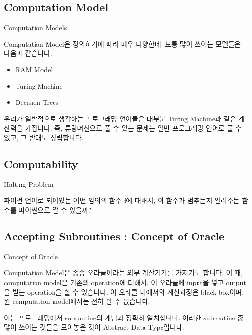 \documentclass{beamer}
\begin{document}
\subsection{Computation Model} 

\begin{frame}{Computation Models} 

Computation Model은 정의하기에 따라 매우 다양한데, 보통 많이 쓰이는 모델들은 다음과 같습니다. 

\begin{itemize} 
\item RAM Model 
\item Turing Machine 
\item Decision Trees
\end{itemize}

우리가 일반적으로 생각하는 프로그래밍 언어들은 대부분 Turing Machine과 같은 계산력을 가집니다. 즉, 튜링머신으로 풀 수 있는 문제는 일반 프로그래밍 언어로 풀 수 있고, 그 반대도 성립합니다. 
\end{frame} 


\subsection{Computability} 


\begin{frame}{Halting Problem}

파이썬 언어로 되어있는 어떤 임의의 함수 f에 대해서, 이 함수가 멈추는지 알려주는 함수를 파이썬으로 짤 수 있을까?

\end{frame}

\subsection{Accepting Subroutines : Concept of Oracle}

\begin{frame}{Concept of Oracle} 

Computation Model은 종종 오라클이라는 외부 계산기기를 가지기도 합니다. 이 때, computation model은 기존의 operation에 더해서, 이 오라클에 input을 넣고 output을 받는 operation을 할 수 있습니다. 이 오라클 내에서의 계산과정은 black box이며, 원 computation model에서는 전혀 알 수 없습니다. 

이는 프로그래밍에서 subroutine의 개념과 정확히 일치합니다. 이러한 subroutine 중 많이 쓰이는 것들을 모아놓은 것이 Abstract Data Type입니다. 

\end{frame}
\end{document}
